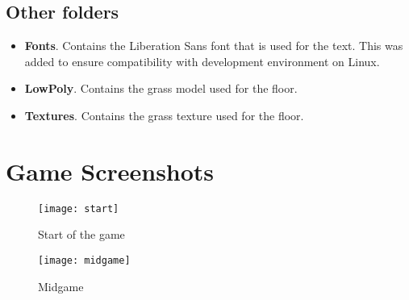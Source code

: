 \documentclass[
	emulatestandardclasses, %
	11pt,
	a4paper,
	toc=bib, %
	parskip=half-,
	numbers=endperiod,
]{scrartcl}
\begin{document}
\subsection{Other folders}

\begin{itemize}
	\item \textbf{Fonts}. Contains the Liberation Sans font that is used for the text. This was added to ensure compatibility with development environment on Linux.
	\item \textbf{LowPoly}. Contains the grass model used for the floor.
	\item \textbf{Textures}. Contains the grass texture used for the floor.
\end{itemize}

\section{Game Screenshots}

\begin{figure}[H]
	\centering
	\label{fig:start}
	\texttt{[image: start]}
	\caption{Start of the game}
\end{figure}

\begin{figure}[H]
	\centering
	\label{fig:midgame}
	\texttt{[image: midgame]}
	\caption{Midgame}
\end{figure}
\end{document}
